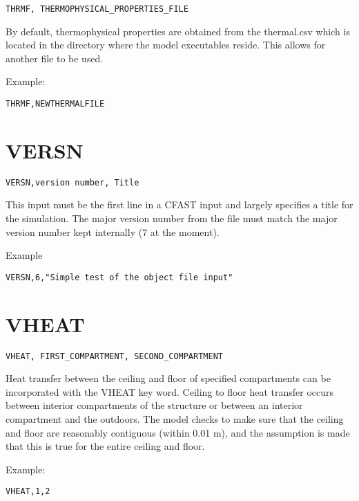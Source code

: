\begin{lstlisting}
THRMF, THERMOPHYSICAL_PROPERTIES_FILE
\end{lstlisting}

By default, thermophysical properties are obtained from the thermal.csv which is located in the directory where the model executables reside. This allows for another file to be used.

Example:

\begin{lstlisting}
THRMF,NEWTHERMALFILE
\end{lstlisting}

\section{VERSN}

\begin{lstlisting}
VERSN,version number, Title
\end{lstlisting}

This input must be the first line in a CFAST input and largely specifies a title for the simulation. The major version number from the file must match the major version number kept internally (7 at the moment).

Example

\begin{lstlisting}
VERSN,6,"Simple test of the object file input"
\end{lstlisting}

\section{VHEAT}

\begin{lstlisting}
VHEAT, FIRST_COMPARTMENT, SECOND_COMPARTMENT
\end{lstlisting}

Heat transfer between the ceiling and floor of specified compartments can be incorporated with the VHEAT key word. Ceiling to floor heat transfer occurs between interior compartments of the structure or between an interior compartment and the outdoors. The model checks to make sure that the ceiling and floor are reasonably contiguous (within 0.01 m), and the assumption is made that this is true for the entire ceiling and floor.

Example:

\begin{lstlisting}
VHEAT,1,2
\end{lstlisting}

